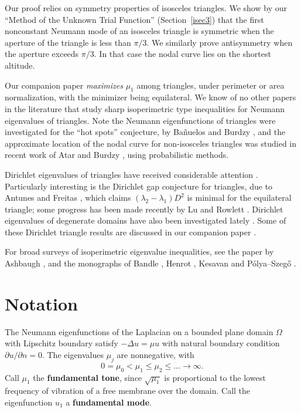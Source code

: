 \documentclass[11pt,reqno]{amsart}
\numberwithin{equation}{section}
\begin{document}
Our proof relies on symmetry properties of isosceles triangles.
We show by our ``Method of the Unknown Trial Function''
(Section~\ref{isec3}) that the first nonconstant Neumann mode of
an isosceles triangle is symmetric when the aperture of the
triangle is less than $\pi/3$. We similarly prove antisymmetry
when the aperture exceeds $\pi/3$. In that case the nodal curve
lies on the shortest altitude. 

Our companion paper \cite{LS09a} \emph{maximizes} $\mu_1$ among
triangles, under perimeter or area normalization, with the minimizer being
equilateral. We know of no other papers in the literature that
study sharp isoperimetric type inequalities for Neumann
eigenvalues of triangles. Note the Neumann eigenfunctions of triangles were investigated for the ``hot spots'' conjecture, by Ba\~{n}uelos and Burdzy \cite{BaBu}, and the approximate location of the nodal curve for non-isosceles triangles was studied in recent work of Atar and Burdzy \cite{AtBu}, using probabilistic methods. 

Dirichlet eigenvalues of triangles have received considerable
attention \cite{AF06,F06,fresiu,S07,S09}. Particularly interesting is the Dirichlet gap conjecture for triangles, due to Antunes and Freitas \cite{AF08}, which claims $(\lambda_2 - \lambda_1)D^2$ is minimal for the equilateral triangle; some progress has been made recently by Lu and Rowlett \cite{LR08}. Dirichlet eigenvalues of degenerate domains have also
been investigated lately \cite{BF09,F07}. Some of these Dirichlet triangle results are discussed in our companion paper \cite[Section~10]{LS09a}.

For broad surveys of isoperimetric eigenvalue
inequalities, see the paper by Ashbaugh \cite{A99}, and the
monographs of Bandle \cite{B79}, Henrot \cite{He06}, Kesavan
\cite{K06} and P\'{o}lya--Szeg\H{o} \cite{PS51}.

\section{\bf Notation}
\label{notation}

The Neumann eigenfunctions of the Laplacian on a bounded plane
domain $\Omega$ with Lipschitz boundary satisfy $-\Delta u = \mu u$ with
natural boundary condition $\partial u / \partial n = 0$. The
eigenvalues $\mu_j$ are nonnegative, with
\[
0 = \mu_0 < \mu_1 \leq \mu_2 \leq \dots \to \infty .
\]
Call $\mu_1$ the \textbf{fundamental tone}, since
$\sqrt{\mu_1}$ is proportional to the lowest frequency of vibration
of a free membrane over the domain. Call the eigenfunction $u_1$ a
\textbf{fundamental mode}.
\end{document}
